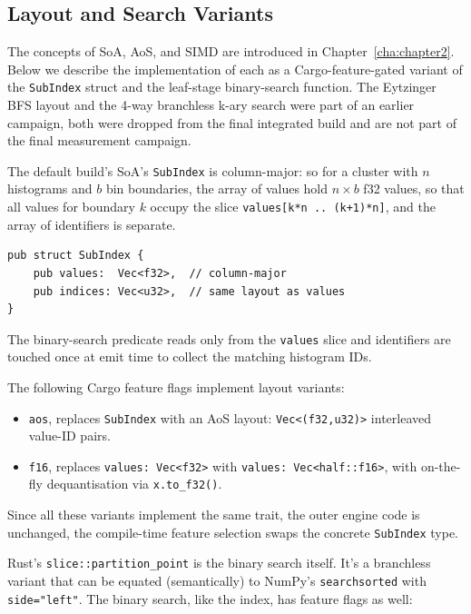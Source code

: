 \subsection{Layout and Search Variants\label{sec:method:impl:variants}}

The concepts of SoA, AoS, and SIMD are introduced in Chapter~\ref{cha:chapter2}. Below we describe the implementation of each as a Cargo-feature-gated variant of the \texttt{SubIndex} struct and the leaf-stage binary-search function. The Eytzinger BFS layout and the 4-way branchless k-ary search were part of an earlier campaign, both were dropped from the final integrated build and are not part of the final measurement campaign.

The default build's SoA's \texttt{SubIndex} is column-major: so for a cluster with $n$ histograms and $b$ bin boundaries, the array of values hold $n \times b$ f32 values, so that all values for boundary $k$ occupy the slice \texttt{values[k*n .. (k+1)*n]}, and the array of identifiers is separate.

\begin{verbatim}
pub struct SubIndex {
    pub values:  Vec<f32>,  // column-major
    pub indices: Vec<u32>,  // same layout as values
}
\end{verbatim}


The binary-search predicate reads only from the \texttt{values} slice and identifiers are touched once at emit time to collect the matching histogram IDs.

The following Cargo feature flags implement layout variants:
\begin{itemize}
    \item \texttt{aos}, replaces \texttt{SubIndex} with an AoS layout: \texttt{Vec<(f32,u32)>} interleaved value-ID pairs.
    \item \texttt{f16}, replaces \texttt{values: Vec<f32>} with \texttt{values: Vec<half::f16>}, with on-the-fly dequantisation via \texttt{x.to\_f32()}.
\end{itemize}

Since all these variants implement the same trait, the outer engine code is unchanged, the compile-time feature selection swaps the concrete \texttt{SubIndex} type.

Rust's \texttt{slice::partition\_point} is the binary search itself. It's a branchless variant that can be equated (semantically) to NumPy's \texttt{searchsorted} with \texttt{side="left"}. The binary search, like the index, has feature flags as well:

